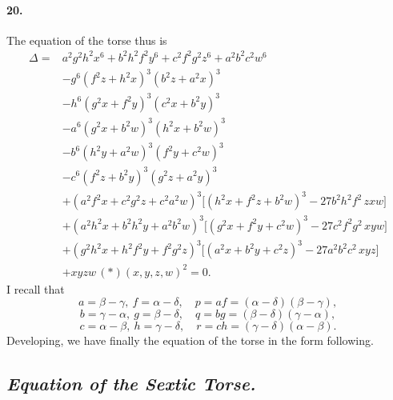 \documentclass[11pt,a4paper]{article}
\begin{document}
\paragraph{20.}
The equation of the torse thus is
\[
\begin{aligned}
\Delta = {}& a^2 g^2 h^2 x^6 + b^2 h^2 f^2 y^6 + c^2 f^2 g^2 z^6 + a^2 b^2 c^2 w^6 \\
& - g^6 (f^2 z + h^2 x)^3 (b^2 z + a^2 x)^3 \\
& - h^6 (g^2 x + f^2 y)^3 (c^2 x + b^2 y)^3 \\
& - a^6 (g^2 x + b^2 w)^3 (h^2 x + b^2 w)^3 \\
& - b^6 (h^2 y + a^2 w)^3 (f^2 y + c^2 w)^3 \\
& - c^6 (f^2 z + b^2 y)^3 (g^2 z + a^2 y)^3 \\
& + (a^2 f^2 x + c^2 g^2 z + c^2 a^2 w)^3 \bigl[ (h^2 x + f^2 z + b^2 w)^3 - 27 b^2 h^2 f^2 \, zxw \bigr] \\
& + (a^2 h^2 x + b^2 h^2 y + a^2 b^2 w)^3 \bigl[ (g^2 x + f^2 y + c^2 w)^3 - 27 c^2 f^2 g^2 \, xyw \bigr] \\
& + (g^2 h^2 x + h^2 f^2 y + f^2 g^2 z)^3 \bigl[ (a^2 x + b^2 y + c^2 z)^3 - 27 a^2 b^2 c^2 \, xyz \bigr] \\
& + xyzw \, (*)(x, y, z, w)^2 = 0.
\end{aligned}
\]
I recall that
\[
a = \beta - \gamma,\ f = \alpha - \delta,\quad p = af = (\alpha - \delta)(\beta - \gamma),
\]
\[
b = \gamma - \alpha,\ g = \beta - \delta,\quad q = bg = (\beta - \delta)(\gamma - \alpha),
\]
\[
c = \alpha - \beta,\ h = \gamma - \delta,\quad r = ch = (\gamma - \delta)(\alpha - \beta).
\]
Developing, we have finally the equation of the torse in the form following.

\subsection*{\textit{Equation of the Sextic Torse.}}
\end{document}
